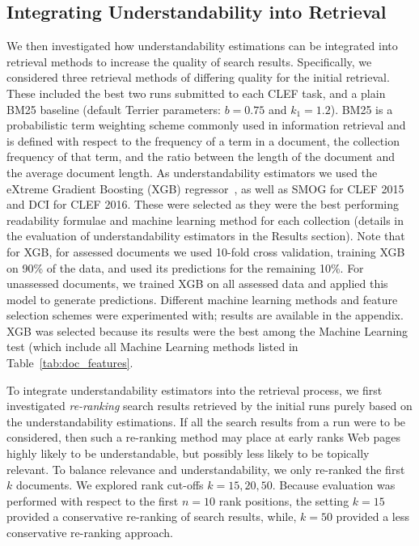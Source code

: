 \documentclass[10pt,a4paper]{article}
\begin{document}
\subsection*{Integrating Understandability into Retrieval}
\label{sec:method_ltr}

We then investigated how understandability estimations can be integrated into retrieval methods to increase the quality of search results.
Specifically, we considered three retrieval methods of differing quality for the initial retrieval. These included the best two runs submitted to each CLEF task, and a plain BM25 baseline (default Terrier parameters: $b=0.75$ and $k_1=1.2$). BM25 is a probabilistic term weighting scheme commonly used in information retrieval and is defined with respect to the frequency of a term in a document, the collection frequency of that term, and the ratio between the length of the document and the average document length. As understandability estimators we used the eXtreme Gradient Boosting (XGB) regressor~\cite{chen16}, as well as SMOG for CLEF 2015 and DCI for CLEF 2016. 
These were selected as they were the best performing readability formulae and machine learning method for each collection (details in the evaluation of understandability estimators in the Results section).
Note that for XGB, for assessed documents we used 10-fold cross validation, training XGB on 90\% of the data, and used its predictions for the remaining 10\%. For unassessed documents, we trained XGB on all assessed data and applied this model to generate predictions. Different machine learning methods and feature selection schemes were experimented with; results are available in the appendix. XGB was selected because its results were the best among the Machine Learning test (which include all Machine Learning methods listed in Table~\ref{tab:doc_features}.

To integrate understandability estimators into the retrieval process, we first investigated \textit{re-ranking} search results retrieved by the initial runs purely based on the understandability estimations. 
If all the search results from a run were to be considered, then such a re-ranking method may place at early ranks Web pages highly likely to be understandable, but possibly less likely to be topically relevant. To balance relevance and understandability, we only re-ranked the first $k$ documents. We explored rank cut-offs $k = 15, 20, 50$. Because evaluation was performed with respect to the first $n=10$ rank positions, the setting $k=15$ provided a conservative re-ranking of search results, while, $k=50$ provided a less conservative re-ranking approach.
\end{document}
